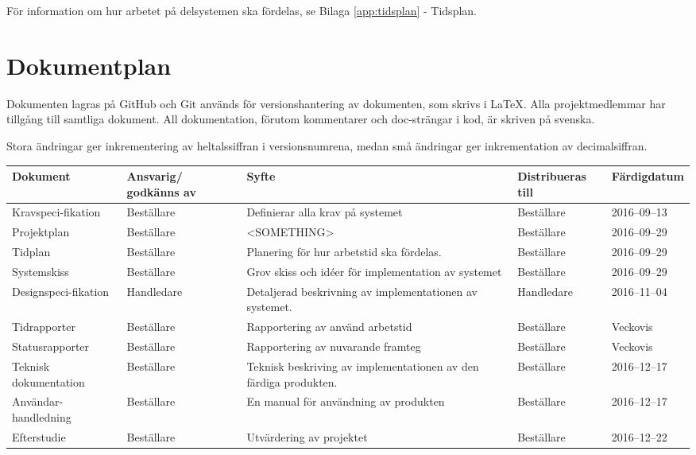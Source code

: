 \documentclass[a4paper,titlepage,12pt]{article}
\begin{document}
    För information om hur arbetet på delsystemen ska fördelas, se Bilaga
    \ref{app:tidsplan} - Tidsplan.
	
	\section{Dokumentplan}
    Dokumenten lagras på GitHub och Git används för versionshantering av
    dokumenten, som skrivs i LaTeX. Alla projektmedlemmar har tillgång till
    samtliga dokument. All dokumentation, förutom kommentarer och doc-strängar
    i kod, är skriven på svenska.

    Stora ändringar ger inkrementering av heltalssiffran i versionsnumrena,
    medan små ändringar ger inkrementation av decimalsiffran.
	
    \begin{longtable}[l]{ p{2.5cm} p{2.1cm} p{4cm} p{2.2cm} l }
        \textbf{Dokument} & \textbf{Ansvarig/ godkänns av} & \textbf{Syfte} & \textbf{Distribueras till} & \textbf{Färdigdatum} \\ \midrule
        
        Kravspeci-fikation & Beställare & Definierar alla krav på
        systemet & Beställare & 2016--09--13 \\ \midrule

        Projektplan & Beställare & <SOMETHING> & Beställare &
        2016--09--29 \\ \midrule

        Tidplan & Beställare & Planering för hur arbetstid ska
        fördelas. & Beställare & 2016--09--29  \\ \midrule
        
        Systemskiss & Beställare & Grov skiss och idéer för 
        implementation av systemet & Beställare & 2016--09--29 \\ \midrule

        Designspeci-fikation & Handledare & Detaljerad beskrivning av
        implementationen av systemet. & Handledare & 2016--11--04 \\ \midrule

        Tidrapporter & Beställare & Rapportering av använd arbetstid &
        Beställare & Veckovis        \\ \midrule

        Statusrapporter & Beställare & Rapportering av nuvarande framteg &
        Beställare & Veckovis \\ \midrule

        Teknisk dokumentation & Beställare & Teknisk beskriving av
        implementationen av den färdiga produkten. & Beställare &
        2016--12--17 \\ \midrule

        Användar- handledning & Beställare & En manual för användning av
        produkten & Beställare & 2016--12--17 \\ \midrule

        Efterstudie & Beställare & Utvärdering av projektet &
        Beställare & 2016--12--22  \\ \midrule
    \end{longtable}
	
\end{document}
